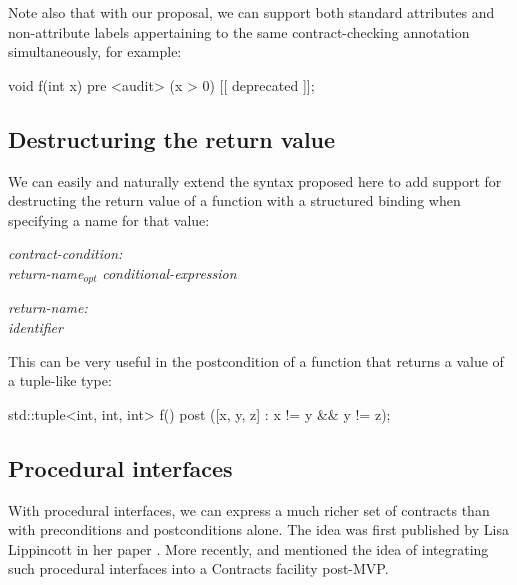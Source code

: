 Note also that with our proposal, we can support both standard attributes and non-attribute labels appertaining to the same contract-checking annotation simultaneously, for example:

\vspace{2mm}
\begin{codeblock}
void f(int x)
  pre <audit> (x > 0) [[ deprecated ]];
\end{codeblock}
\vspace{2mm}


\subsection{Destructuring the return value}
\label{subsec:struct}

We can easily and naturally extend the syntax proposed here to add support for destructing the return value of a function with a structured binding when specifying a name for that value:

\emph{contract-condition:} \\
\phantom{~~~}\tcode{(} \emph{return-name}$_{opt}$ \emph{conditional-expression} \tcode{)}

\emph{return-name:}\\
\phantom{~~~}\emph{identifier} \tcode{:} \\
\phantom{~~~}

This can be very useful in the postcondition of a function that returns a value of a tuple-like type:

\vspace{2mm}
\begin{codeblock}
std::tuple<int, int, int> f()
  post ([x, y, z] : x != y && y != z);
\end{codeblock}
\vspace{2mm}

\subsection{Procedural interfaces}
\label{subsec:interfaces}

With procedural interfaces, we can express a much richer set of contracts than with preconditions and postconditions alone. The idea was first published by Lisa Lippincott in her paper \cite{P0465R0}. More recently, \cite{P2885R2} and \cite{P2935R0} mentioned the idea of integrating such procedural interfaces into a Contracts facility post-MVP.

